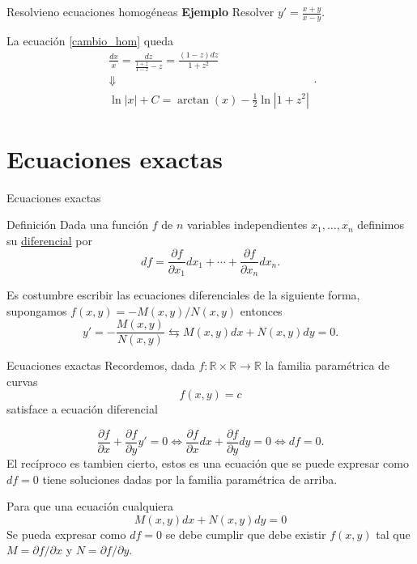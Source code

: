\documentclass[handout,hyperref={colorlinks=true}]{beamer}
\newcommand{\rr}{\mathbb{R}}
\newcommand{\nl}{\onslide<+-> }
\begin{document}
\begin{frame}{Resolvieno ecuaciones homogéneas}
\textbf{Ejemplo} Resolver $y'=\frac{x+y}{x-y}$. 

La ecuación \eqref{cambio_hom} queda
\[ \begin{array}{c} \frac{dx}{x}=\frac{dz}{\frac{1+z}{1-z}-z}=\frac{(1-z)dz}{1+z^2}\\
 \Downarrow\\
\ln|x|+C=\arctan(x)-\frac{1}{2}\ln|1+z^2|
    \end{array}.
\]



\end{frame}

\section{Ecuaciones exactas}

\begin{frame}{Ecuaciones exactas}

\begin{block}{Definición}
\nl Dada una función $f$ de $n$ variables independientes $x_1,\ldots,x_n$ definimos su \href{http://es.wikipedia.org/wiki/Diferencial_de_una_función}{diferencial}
 por 
 \[df=\frac{\partial f}{\partial x_1}dx_1+\cdots +\frac{\partial f}{\partial x_n}dx_n.\]
\end{block}

\nl Es costumbre escribir las ecuaciones diferenciales   de la siguiente forma, supongamos  $f(x,y)=-M(x,y)/N(x,y)$
entonces
\[y'=-\frac{M(x,y)}{N(x,y)}\leftrightarrows M(x,y)dx+N(x,y)dy=0.\] 


\end{frame}

\begin{frame}{Ecuaciones exactas}
\nl Recordemos, dada $f:\rr\times\rr\to\rr$ la familia paramétrica de curvas
\[f(x,y)=c\]
satisface a ecuación diferencial

\[
 \frac{\partial f}{\partial x}+\frac{\partial f}{\partial y}y'=0\Longleftrightarrow \frac{\partial f}{\partial x}dx+\frac{\partial f}{\partial y}dy=0
 \Longleftrightarrow df=0.
\]
\nl El recíproco es tambien cierto, estos es una ecuación que se puede expresar como $df=0$  tiene soluciones dadas por la familia paramétrica de arriba. 

\nl Para que una ecuación cualquiera
\[M(x,y)dx+N(x,y)dy=0\]
Se pueda expresar como $df=0$ se debe cumplir que debe existir $f(x,y)$ tal que $M=\partial f/\partial x$ y $N=\partial f/\partial y$.
\end{frame}
\end{document}
